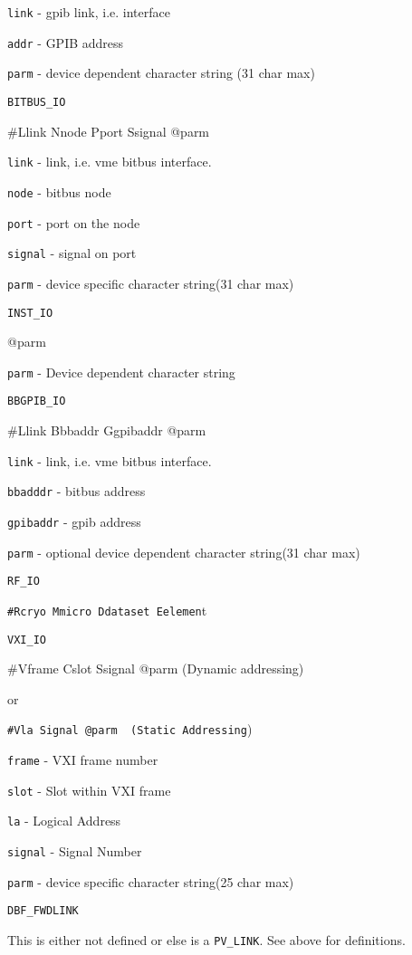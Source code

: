 \verb|link| - gpib link, i.e. interface

\verb|addr| - GPIB address

\verb|parm| - device dependent character string (31 char max)

\verb|BITBUS_IO|

\#Llink Nnode Pport Ssignal @parm

\verb|link| - link, i.e.  vme bitbus interface.

\verb|node| - bitbus node

\verb|port| - port on the node

\verb|signal| - signal on port

\verb|parm| - device specific character string(31 char max)

\verb|INST_IO|

@parm

\verb|parm| - Device dependent character string

\verb|BBGPIB_IO|

\#Llink Bbbaddr Ggpibaddr @parm

\verb|link| - link, i.e. vme bitbus interface.

\verb|bbadddr| - bitbus address

\verb|gpibaddr| - gpib address

\verb|parm| - optional device dependent character string(31 char max)

\verb|RF_IO|

\verb|#Rcryo Mmicro Ddataset Eelemen|t

\verb|VXI_IO|

\#Vframe Cslot Ssignal @parm (Dynamic addressing)

     or

\verb|#Vla Signal @parm  (Static Addressing|)

\verb|frame| - VXI frame number

\verb|slot| - Slot within VXI frame

\verb|la| - Logical Address

\verb|signal| - Signal Number

\verb|parm| - device specific character string(25 char max)

\verb|DBF_FWDLINK|

This is either not defined or else is a \verb|PV_LINK|. See above for definitions.

